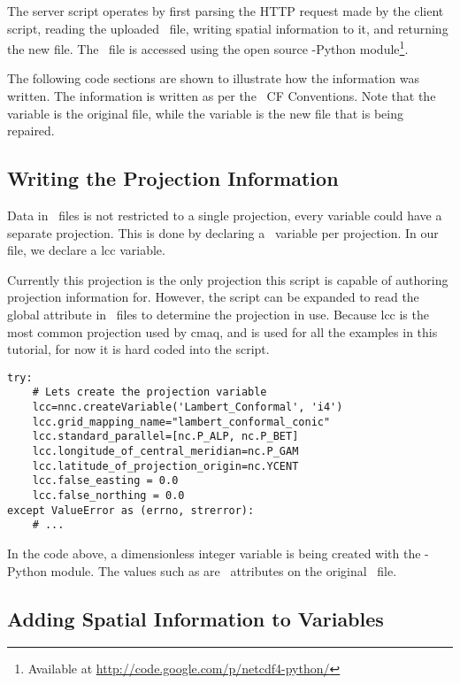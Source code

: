 The server script operates by first parsing the HTTP request made by the client
script, reading the uploaded \ioapi~file, writing spatial information to it,
and returning the new file.  The \ioapi~file is accessed using the open source
-Python module\footnote{Available at
\url{http://code.google.com/p/netcdf4-python/}}.

The following code sections are shown to illustrate how the information was
written.  The information is written as per the \netcdf~CF Conventions.  Note
that the variable  is the original file, while the variable 
is the new file that is being repaired.

\subsection{Writing the Projection Information}

Data in \netcdf~files is not restricted to a single projection, every variable
could have a separate projection.  This is done by declaring a \netcdf~variable
per projection.  In our file, we declare a \ac{lcc} variable. 

Currently this projection is the only projection this script is
capable of authoring projection information for.  However, the script
can be expanded to read the global attribute  in
\ioapi~files to determine the projection in use. Because \ac{lcc} is
the most common projection used by \ac{cmaq}, and is used for all the
examples in this tutorial, for now it is hard coded into the script.

\singlespace
\begin{verbatim}
try:
	# Lets create the projection variable
	lcc=nnc.createVariable('Lambert_Conformal', 'i4')
	lcc.grid_mapping_name="lambert_conformal_conic"
	lcc.standard_parallel=[nc.P_ALP, nc.P_BET]
	lcc.longitude_of_central_meridian=nc.P_GAM
	lcc.latitude_of_projection_origin=nc.YCENT
	lcc.false_easting = 0.0
	lcc.false_northing = 0.0
except ValueError as (errno, strerror):
	# ...
\end{verbatim}
\doublespace

In the code above, a dimensionless integer variable is being created with the -Python module.  The values such as  are \ioapi~attributes on the original \ioapi~file.

\subsection{Adding Spatial Information to Variables}

